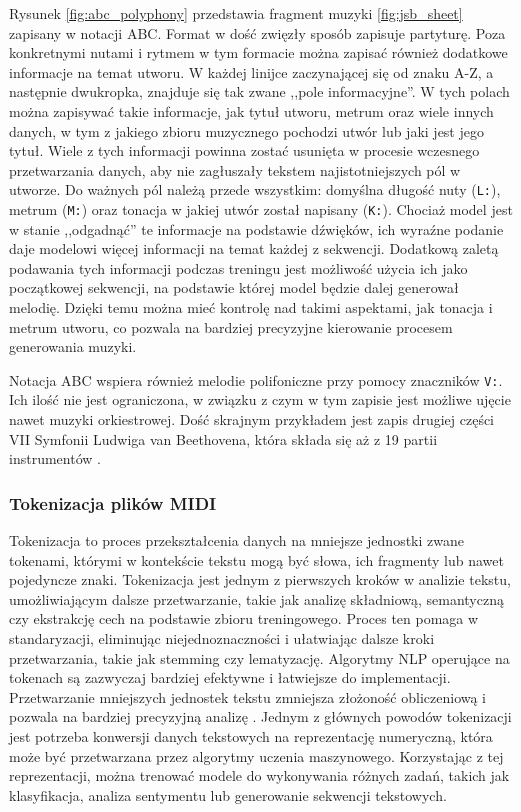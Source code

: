 \documentclass[data-science]{agh-wi} %
\begin{document}
Rysunek \ref*{fig:abc_polyphony} przedstawia fragment muzyki \ref*{fig:jsb_sheet} zapisany w notacji ABC. Format w dość zwięzły sposób zapisuje partyturę. Poza konkretnymi nutami i rytmem w tym formacie można zapisać również dodatkowe informacje na temat utworu. W każdej linijce zaczynającej się od znaku A-Z, a następnie dwukropka, znajduje się tak zwane ,,pole informacyjne''. W tych polach można zapisywać takie informacje, jak tytuł utworu, metrum oraz wiele innych danych, w tym z jakiego zbioru muzycznego pochodzi utwór lub jaki jest jego tytuł. Wiele z tych informacji powinna zostać usunięta w procesie wczesnego przetwarzania danych, aby nie zagłuszały tekstem najistotniejszych pól w utworze. Do ważnych pól należą przede wszystkim: domyślna długość nuty (\texttt{L:}), metrum (\texttt{M:}) oraz tonacja w jakiej utwór został napisany (\texttt{K:}). Chociaż model jest w stanie ,,odgadnąć'' te informacje na podstawie dźwięków, ich wyraźne podanie daje modelowi więcej informacji na temat każdej z sekwencji. Dodatkową zaletą podawania tych informacji podczas treningu jest możliwość użycia ich jako początkowej sekwencji, na podstawie której model będzie dalej generował melodię. Dzięki temu można mieć kontrolę nad takimi aspektami, jak tonacja i metrum utworu, co pozwala na bardziej precyzyjne kierowanie procesem generowania muzyki.

Notacja ABC wspiera również melodie polifoniczne przy pomocy znaczników \texttt{V:}. Ich ilość nie jest ograniczona, w związku z czym w tym zapisie jest możliwe ujęcie nawet muzyki orkiestrowej. Dość skrajnym przykładem jest zapis drugiej części VII Symfonii Ludwiga van Beethovena, która składa się aż z 19 partii instrumentów \cite{beethoven}.

\subsubsection*{Tokenizacja plików MIDI}\label{sec:REMI}
Tokenizacja to proces przekształcenia danych na mniejsze jednostki zwane tokenami, którymi w kontekście tekstu mogą być słowa, ich fragmenty lub nawet pojedyncze znaki. Tokenizacja jest jednym z pierwszych kroków w analizie tekstu, umożliwiającym dalsze przetwarzanie, takie jak analizę składniową, semantyczną czy ekstrakcję cech na podstawie zbioru treningowego. Proces ten pomaga w standaryzacji, eliminując niejednoznaczności i ułatwiając dalsze kroki przetwarzania, takie jak stemming czy lematyzację. Algorytmy NLP operujące na tokenach są zazwyczaj bardziej efektywne i łatwiejsze do implementacji. Przetwarzanie mniejszych jednostek tekstu zmniejsza złożoność obliczeniową i pozwala na bardziej precyzyjną analizę \cite*{tokenizacja}. Jednym z głównych powodów tokenizacji jest potrzeba konwersji danych tekstowych na reprezentację numeryczną, która może być przetwarzana przez algorytmy uczenia maszynowego. Korzystając z tej reprezentacji, można trenować modele do wykonywania różnych zadań, takich jak klasyfikacja, analiza sentymentu lub generowanie sekwencji tekstowych.
\end{document}
